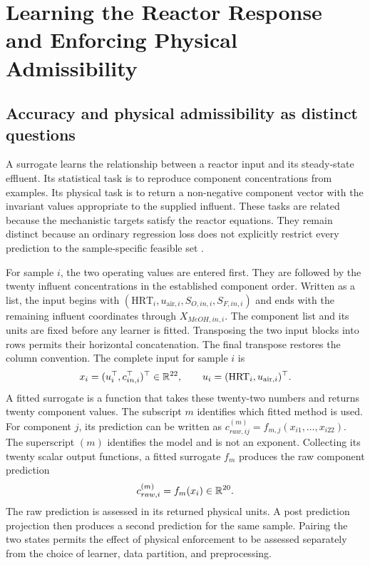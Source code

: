 \chapter{Learning the Reactor Response and Enforcing Physical Admissibility}
\label{ch:projection}

\section{Accuracy and physical admissibility as distinct questions}

A surrogate learns the relationship between a reactor input and its steady-state effluent. Its statistical task is to reproduce component concentrations from examples. Its physical task is to return a non-negative component vector with the invariant values appropriate to the supplied influent. These tasks are related because the mechanistic targets satisfy the reactor equations. They remain distinct because an ordinary regression loss does not explicitly restrict every prediction to the sample-specific feasible set \citep{Kashinath2021,Hansen2024}.

For sample $i$, the two operating values are entered first. They are followed by the twenty influent concentrations in the established component order. Written as a list, the input begins with $(\mathrm{HRT}_i,u_{\mathrm{air},i},S_{O,in,i},S_{F,in,i})$ and ends with the remaining influent coordinates through $X_{MeOH,in,i}$. The component list and its units are fixed before any learner is fitted. Transposing the two input blocks into rows permits their horizontal concatenation. The final transpose restores the column convention. The complete input for sample $i$ is
\begin{equation}
\equationname{Reactor surrogate inputs from operation and influent concentrations}
x_i=(u_i^\top,c_{in,i}^\top)^\top\in\mathbb{R}^{22},\qquad
u_i=(\mathrm{HRT}_i,u_{\mathrm{air},i})^\top.
\label{eq:surrogate_input_vector}
\end{equation}
A fitted surrogate is a function that takes these twenty-two numbers and returns twenty component values. The subscript $m$ identifies which fitted method is used. For component $j$, its prediction can be written as $c_{raw,ij}^{(m)}=f_{m,j}(x_{i1},\ldots,x_{i22})$. The superscript $(m)$ identifies the model and is not an exponent. Collecting its twenty scalar output functions, a fitted surrogate $f_m$ produces the raw component prediction
\begin{equation}
\equationname{Raw component-state prediction from a fitted surrogate}
c_{raw,i}^{(m)}=f_m(x_i)\in\mathbb{R}^{20}.
\label{eq:surrogate_raw_state}
\end{equation}
The raw prediction is assessed in its returned physical units. A post prediction projection then produces a second prediction for the same sample. Pairing the two states permits the effect of physical enforcement to be assessed separately from the choice of learner, data partition, and preprocessing.

